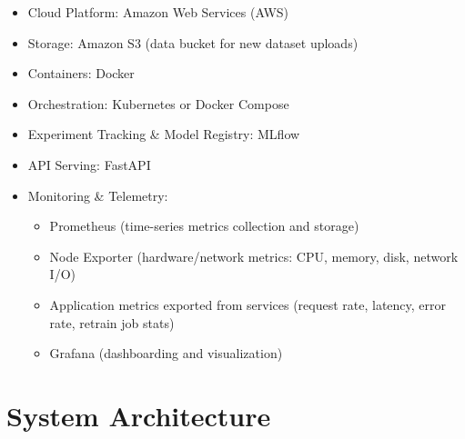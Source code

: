 \documentclass[10pt]{article}
\begin{document}
\begin{itemize}[leftmargin=*]
    \item Cloud Platform: Amazon Web Services (AWS)
    \item Storage: Amazon S3 (data bucket for new dataset uploads)
    \item Containers: Docker
    \item Orchestration: Kubernetes or Docker Compose
    \item Experiment Tracking \& Model Registry: MLflow
    \item API Serving: FastAPI
    \item Monitoring \& Telemetry:
    \begin{itemize}[leftmargin=*]
        \item Prometheus (time-series metrics collection and storage)
        \item Node Exporter (hardware/network metrics: CPU, memory, disk, network I/O)
        \item Application metrics exported from services (request rate, latency, error rate, retrain job stats)
        \item Grafana (dashboarding and visualization)
    \end{itemize}
\end{itemize}

\newpage


\section*{System Architecture}
\end{document}
